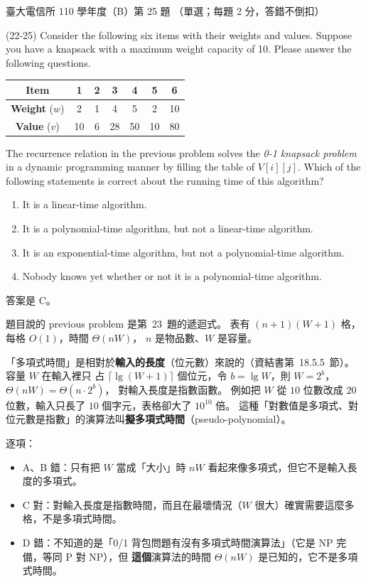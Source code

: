 \begin{pastexam}[label={px:ntu-110-comm-dsa-25}]{臺大電信所 110 學年度（B）第 25 題}
（單選；每題 2 分，答錯不倒扣）

(22-25) Consider the following six items with their weights and values. Suppose you have a knapsack with a maximum weight capacity of 10. Please answer the following questions.
\begin{center}
\begin{tabular}{|c|c|c|c|c|c|c|}
\hline
\textbf{Item} & \textbf{1} & \textbf{2} & \textbf{3} & \textbf{4} & \textbf{5} & \textbf{6}\\ \hline
\textbf{Weight} ($w$) & 2 & 1 & 4 & 5 & 2 & 10\\ \hline
\textbf{Value} ($v$) & 10 & 6 & 28 & 50 & 10 & 80\\ \hline
\end{tabular}
\end{center}

The recurrence relation in the previous problem solves the \textit{0-1 knapsack problem} in a dynamic programming manner by filling the table of $V[i][j]$. Which of the following statements is correct about the running time of this algorithm?
\begin{enumerate}[label=\Alph*.]
\item It is a linear-time algorithm.
\item It is a polynomial-time algorithm, but not a linear-time algorithm.
\item It is an exponential-time algorithm, but not a polynomial-time algorithm.
\item Nobody knows yet whether or not it is a polynomial-time algorithm.
\end{enumerate}
\end{pastexam}

\begin{pastsoln}
答案是 C。

題目說的 previous problem 是第~23~題的遞迴式。 表有 $(n + 1)(W + 1)$ 格，每格 $O(1)$，時間 $\Theta(nW)$，
$n$ 是物品數、$W$ 是容量。

「多項式時間」是相對於\textbf{輸入的長度}（位元數）來說的（資結書第~18.5.5~節）。 容量 $W$ 在輸入裡只
占 $\lceil\lg(W + 1)\rceil$ 個位元，令 $b = \lg W$，則 $W = 2^b$，$\Theta(nW) = \Theta(n \cdot 2^b)$，
對輸入長度是指數函數。 例如把 $W$ 從 $10$ 位數改成 $20$ 位數，輸入只長了 $10$ 個字元，表格卻大了
$10^{10}$ 倍。 這種「對數值是多項式、對位元數是指數」的演算法叫\textbf{擬多項式時間}（pseudo-polynomial）。

逐項：
\begin{itemize}
\item A、B 錯：只有把 $W$ 當成「大小」時 $nW$ 看起來像多項式，但它不是輸入長度的多項式。
\item C 對：對輸入長度是指數時間，而且在最壞情況（$W$ 很大）確實需要這麼多格，不是多項式時間。
\item D 錯：不知道的是「0/1 背包問題有沒有多項式時間演算法」（它是 NP 完備，等同 P 對 NP），但
\textbf{這個}演算法的時間 $\Theta(nW)$ 是已知的，它不是多項式時間。
\end{itemize}
\end{pastsoln}
